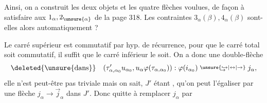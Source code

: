 
Ainsi, on a construit les deux objets et les quatre flèches voulues, de façon à satisfaire aux  $1_\alpha,2_{\unsure{\alpha}}$ de la page 318. Les contraintes $3_\alpha(\beta),4_\alpha(\beta)$ sont-elles alors  automatiquement ?


Le carré supérieur est commutatif par hyp. de récurrence, pour  que le carré total  soit commutatif, il suffit  que le carré inférieur le soit. On a donc une double-flèche
\[
\deleted{\unsure{\text{dans}}}\quad(\tau'_{\alpha,\alpha_0}u_{\alpha_0},u_\alpha\varphi(\tau_{\alpha,\alpha_0})):\varphi(i_{\alpha_0})\mathrel{\substack{\unsure{\hookrightarrow|\leftrightarrow|\rightarrow}\\[-.55ex]\rightarrow}}j_\alpha,
\]
elle n'est peut-être pas triviale mais on sait, $J'$ étant , qu'on peut l'égaliser par une flèche $j_\alpha\to\overrightarrow{j}_\alpha$ dans $J'$. Donc quitte à remplacer $j_\alpha$ par
